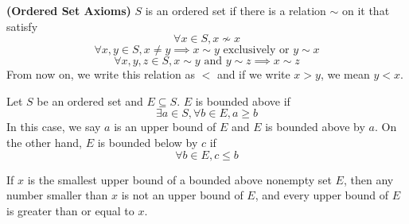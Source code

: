 \documentclass{report}
\begin{document}
\begin{definition}
\textbf{(Ordered Set Axioms)} $S$ is an ordered set if there is a relation $\sim$ on it that satisfy 
\begin{equation}
\forall x\in S, x\not\sim x
\end{equation}
\begin{equation}
\forall x,y\in S, x\neq y\implies x\sim y \text{ exclusively or }y\sim x
\end{equation}
\begin{equation}
  \forall x,y,z\in S, x\sim y \text{ and }y\sim z\implies x\sim z
\end{equation}
From now on, we write this relation as $<$ and if we write  $x>y$, we mean $y<x$.
\end{definition}
\begin{definition}
Let $S$ be an ordered set and $E\subseteq S$. $E$ is bounded above if 
\begin{equation}
\exists a\in S, \forall b\in E, a\geq b 
\end{equation}
In this case, we say $a$ is an upper bound of $E$ and $E$ is bounded above by $a$. On the other hand, $E$ is bounded below by $c$ if
\begin{equation}
\forall b\in E, c\leq b
\end{equation}
\end{definition}
\begin{theorem}
If $x$ is the smallest upper bound of a bounded above nonempty set  $E$, then any number smaller than  $x$ is not an upper bound of  $E$, and every upper bound of  $E$ is greater than or equal  to $x$.
\end{theorem}
\end{document}
